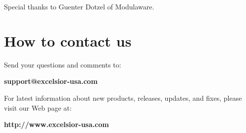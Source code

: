 Special thanks to Guenter Dotzel of Modulaware.

\chapter{How to contact us}
\label{contact}

   Send your questions and comments to:

   {\bf support@excelsior-usa.com}

   For latest information about new products, releases, updates,
   and fixes, please visit our Web page at:

   {\bf http://www.excelsior-usa.com}
  



